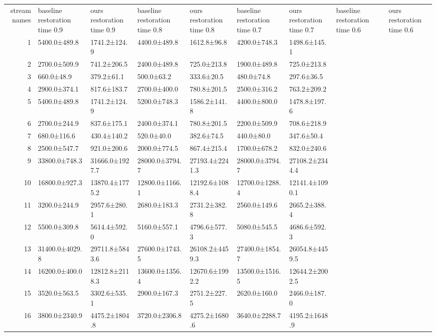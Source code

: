 \begin{tabular}{|r|l|l|l|l|l|l|l|l|}
  \hline
  stream names & baseline restoration time 0.9 & ours restoration time 0.9 & baseline restoration time 0.8 & ours restoration time 0.8 & baseline restoration time 0.7 & ours restoration time 0.7 & baseline restoration time 0.6 & ours restoration time 0.6 \\ 
  1 & 5400.0±489.8 & 1741.2±124.9 & 4400.0±489.8 & 1612.8±96.8 & 4200.0±748.3 & 1498.6±145.1 \\ 
  2 & 2700.0±509.9 & 741.2±206.5 & 2400.0±489.8 & 725.0±213.8 & 1900.0±489.8 & 725.0±213.8 \\ 
  3 & 660.0±48.9 & 379.2±61.1 & 500.0±63.2 & 333.6±20.5 & 480.0±74.8 & 297.6±36.5 \\ 
  4 & 2900.0±374.1 & 817.6±183.7 & 2700.0±400.0 & 780.8±201.5 & 2500.0±316.2 & 763.2±209.2 \\ 
  5 & 5400.0±489.8 & 1741.2±124.9 & 5200.0±748.3 & 1586.2±141.8 & 4400.0±800.0 & 1478.8±197.6 \\ 
  6 & 2700.0±244.9 & 837.6±175.1 & 2400.0±374.1 & 780.8±201.5 & 2200.0±509.9 & 708.6±218.9 \\ 
  7 & 680.0±116.6 & 430.4±140.2 & 520.0±40.0 & 382.6±74.5 & 440.0±80.0 & 347.6±50.4 \\ 
  8 & 2500.0±547.7 & 921.0±200.6 & 2000.0±774.5 & 867.4±215.4 & 1700.0±678.2 & 832.0±240.6 \\ 
  9 & 33800.0±748.3 & 31666.0±1927.7 & 28000.0±3794.7 & 27193.4±2241.3 & 28000.0±3794.7 & 27108.2±2344.4 \\ 
  10 & 16800.0±927.3 & 13870.4±1775.2 & 12800.0±1166.1 & 12192.6±1088.4 & 12700.0±1288.4 & 12141.4±1090.1 \\ 
  11 & 3200.0±244.9 & 2957.6±280.1 & 2680.0±183.3 & 2731.2±382.8 & 2560.0±149.6 & 2665.2±388.4 \\ 
  12 & 5500.0±309.8 & 5614.4±592.0 & 5160.0±557.1 & 4796.6±577.3 & 5080.0±545.5 & 4686.6±592.3 \\ 
  13 & 31400.0±4029.8 & 29711.8±5843.6 & 27600.0±1743.5 & 26108.2±4459.3 & 27400.0±1854.7 & 26054.8±4459.5 \\ 
  14 & 16200.0±400.0 & 12812.8±2118.3 & 13600.0±1356.4 & 12670.6±1992.2 & 13500.0±1516.5 & 12644.2±2002.5 \\ 
  15 & 3520.0±563.5 & 3302.6±535.1 & 2900.0±167.3 & 2751.2±227.5 & 2620.0±160.0 & 2466.0±187.0 \\ 
  16 & 3800.0±2340.9 & 4475.2±1804.8 & 3720.0±2306.8 & 4275.2±1680.6 & 3640.0±2288.7 & 4195.2±1648.9 \\ 

\end{tabular}
